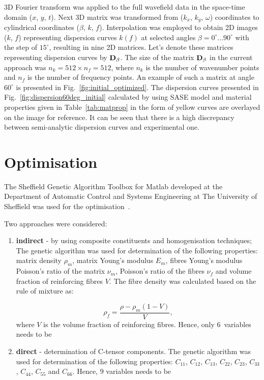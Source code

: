 3D Fourier transform was applied to the full wavefield data in the space-time domain 
(\(x\), \(y\), \(t\)). Next 3D matrix was transformed from (\(k_x\), \(k_y\), \(\omega\)) 
coordinates to cylindrical coordinates (\(\beta\), \(k\), \(f\)). Interpolation was employed 
to 
obtain 2D images (\(k\), \(f\)) representing dispersion curves \(k(f)\) at selected angles 
\(\beta = 0^{\circ} \ldots 90^{\circ}\) with the step of \(15^{\circ}\), resulting in nine 2D 
matrices. Let's denote these matrices representing dispersion curves by 
\(\mathbf{D}_{\beta}\). The size of the matrix  \(\mathbf{D}_{\beta}\) in the current approach 
was \(n_k=512 \times n_f= 512\), where \(n_k\) is the number of wavenumber points 
and \(n_f\) is the number of frequency points.  An example of such a matrix at angle \( 
60^{\circ}\) is presented in Fig.~\ref{fig:initial_optimized}. The dispersion curves 
presented in Fig.~\ref{fig:dispersion60deg_initial} calculated by using SASE model and 
material properties given in Table~\ref{tab:matprop} in the form of yellow curves are 
overlayed on the image for reference. It can be seen that there is a high discrepancy 
between semi-analytic dispersion curves and experimental one. 
	
\section{Optimisation \label{sec:optimization}}
		The Sheffield Genetic Algorithm Toolbox for Matlab developed at the Department of Automatic Control and Systems Engineering at The University of Sheffield was used for the optimisation~\cite{Chipperfield1994}.
	
	Two approaches were considered:
	\begin{enumerate}
		\item \textbf{indirect} - by using composite constituents and homogenisation techniques;
		The genetic algorithm was used for determination of the following properties:  
		matrix density \(\rho_m\), matrix Young's modulus \(E_m\), fibres Young's modulus 
		 Poisson's ratio of the matrix \(\nu_m\), Poisson's ratio of the 
		fibres \(\nu_f\) and volume fraction of reinforcing fibres \(V\).  The fibre density was 
		calculated based on the rule of mixture as:
		
\begin{equation}
		\rho_f = \frac{\rho - \rho_m (1-V)}{V},
		\end{equation}
		where \(V\) is the volume fraction of reinforcing fibres. Hence, only 6~variables 
		needs to be  
		\item \textbf{direct} - determination of C-tensor components.
		The genetic algorithm was used for determination of the following properties: 
		\(C_{11}\), \(C_{12}\), \(C_{13}\),  \(C_{22}\), \(C_{23}\), \(C_{33}\), \(C_{44}\), 
		\(C_{55}\) and \(C_{66}\). Hence, 9 variables needs to be  
	\end{enumerate}

